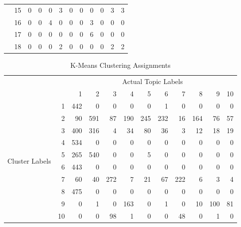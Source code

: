\documentclass[11pt]{article}
\begin{document}
\begin{table}[htbp]
\begin{tabular}{rr|r|r|r|r|r|r|r|r|r|r}
    \multicolumn{1}{c}{} & 15    & 0     & 0     & 0     & 3     & 0     & 0     & 0     & 0     & 3     & 3 \\
    \multicolumn{1}{c}{} & 16    & 0     & 0     & 4     & 0     & 0     & 0     & 3     & 0     & 0     & 0 \\
    \multicolumn{1}{c}{} & 17    & 0     & 0     & 0     & 0     & 0     & 0     & 6     & 0     & 0     & 0 \\
    \multicolumn{1}{c}{} & 18    & 0     & 0     & 0     & 2     & 0     & 0     & 0     & 0     & 2     & 2 \\
    \bottomrule
    \end{tabular}%
  \label{tab:hier}%
\end{table}%

\begin{table}[htbp]
  \centering
  \caption{K-Means Clustering Assignments}
    \begin{tabular}{rr|r|r|r|r|r|r|r|r|r|r}
    \toprule
          &       & \multicolumn{10}{c}{Actual Topic Labels} \\
            &       & 1     & 2     & 3     & 4     & 5     & 6     & 7     & 8     & 9     & 10 \\
    \midrule \multicolumn{1}{c}{\multirow{10}[5]{*}{Cluster Labels}} & 1     & 442   & 0     & 0     & 0     & 0     & 1     & 0     & 0     & 0     & 0 \\
    \multicolumn{1}{c}{} & 2     & 90    & 591   & 87    & 190   & 245   & 232   & 16    & 164   & 76    & 57 \\
    \multicolumn{1}{c}{} & 3     & 400   & 316   & 4     & 34    & 80    & 36    & 3     & 12    & 18    & 19 \\
    \multicolumn{1}{c}{} & 4     & 534   & 0     & 0     & 0     & 0     & 0     & 0     & 0     & 0     & 0 \\
    \multicolumn{1}{c}{} & 5     & 265   & 540   & 0     & 0     & 5     & 0     & 0     & 0     & 0     & 0 \\
    \multicolumn{1}{c}{} & 6     & 443   & 0     & 0     & 0     & 0     & 0     & 0     & 0     & 0     & 0 \\
    \multicolumn{1}{c}{} & 7     & 60    & 40    & 272   & 7     & 21    & 67    & 222   & 6     & 3     & 4 \\
    \multicolumn{1}{c}{} & 8     & 475   & 0     & 0     & 0     & 0     & 0     & 0     & 0     & 0     & 0 \\
    \multicolumn{1}{c}{} & 9     & 0     & 1     & 0     & 163   & 0     & 1     & 0     & 10    & 100   & 81 \\
    \multicolumn{1}{c}{} & 10    & 0     & 0     & 98    & 1     & 0     & 0     & 48    & 0     & 1     & 0 \\
    \bottomrule
    \end{tabular}%
  \label{tab:kmean}%
\end{table}%
\end{document}
